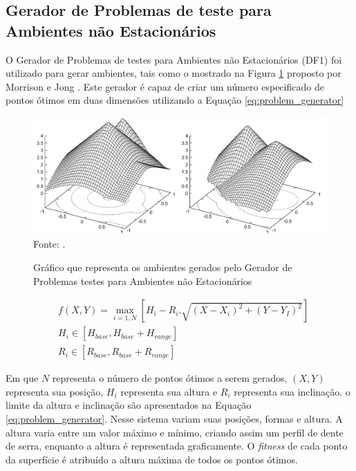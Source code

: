 \subsection{Gerador de Problemas de teste para Ambientes não Estacionários}
\label{sec:df1_generator}

O Gerador de Problemas de testes para Ambientes não Estacionários (DF1) foi utilizado para gerar ambientes, tais como o mostrado na Figura \ref{fig:problem_generator} proposto por Morrison e Jong \cite{morrison1999test}. Este gerador é capaz de criar um número especificado de pontos ótimos em duas dimensões utilizando a Equação \ref{eq:problem_generator} 

\begin{figure}[!htb]
	\caption{Gráfico que representa os ambientes gerados pelo Gerador de Problemas testes para Ambientes não Estacionários}
	\centering
	\includegraphics[scale=0.31]{images/bm_generator.png}
	\label{fig:problem_generator}{\\Fonte: .}
\end{figure}

\begin{equation}
\label{eq:problem_generator}
\begin{split}
& f(X,Y) = \max_{i=1,N}\left[H_i - R_i . \sqrt{(X - X_i)^2 + (Y - Y_I)^2}\right] \\
& H_i \in [H_{base}, H_{base} + H_{range}] \\
& R_i \in [R_{base}, R_{base} + R_{range}]
\end{split}
\end{equation}

\noindent Em que $N$ representa o número de pontos ótimos a serem gerados, $(X,Y)$ representa sua posição, $H_i$ representa sua altura e $R_i$ representa sua inclinação. o limite da altura e inclinação são apresentados na Equação \ref{eq:problem_generator}. Nesse sistema variam suas posições, formas e altura. A altura varia entre um valor máximo e mínimo, criando assim um perfil de dente de serra, enquanto a altura é representada graficamente. O \textit{fitness} de cada ponto da superfície é atribuído a altura máxima de todos os pontos ótimos.

